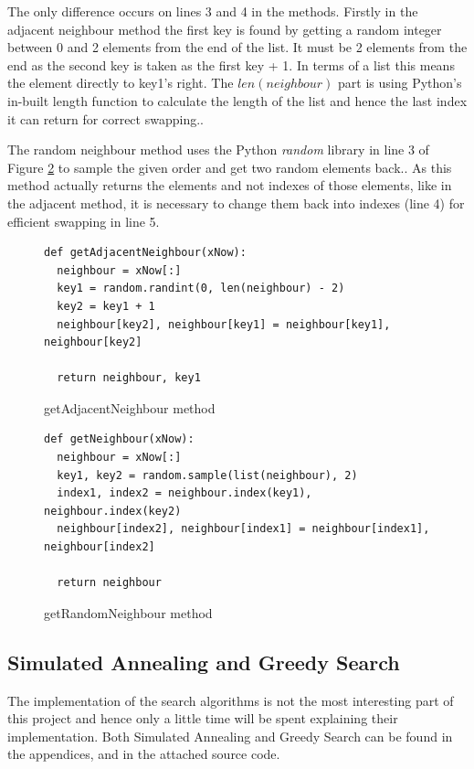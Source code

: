 \documentclass[12pt]{report}
\begin{document}
The only difference occurs on lines 3 and 4 in the methods. Firstly in the adjacent neighbour method the first key is found by getting a random integer between 0 and 2 elements from the end of the list. It must be 2 elements from the end as the second key is taken as the first key + 1. In terms of a list this means the element directly to key1's right. The $len(neighbour)$ part is using Python's in-built length function to calculate the length of the list and hence the last index it can return for correct swapping.\cite{PythonLen}.

The random neighbour method uses the Python \textit{random} library in line 3 of Figure \ref{randomNeighbour} to sample the given order and get two random elements back.\cite{PythonSample}. As this method actually returns the elements and not indexes of those elements, like in the adjacent method, it is necessary to change them back into indexes (line 4) for efficient swapping in line 5.

\begin{figure}[H]
\caption{getAdjacentNeighbour method}
\label{adjacentNeighbour}
\begin{lstlisting}
def getAdjacentNeighbour(xNow):
  neighbour = xNow[:]
  key1 = random.randint(0, len(neighbour) - 2)
  key2 = key1 + 1
  neighbour[key2], neighbour[key1] = neighbour[key1], neighbour[key2]
    
  return neighbour, key1
\end{lstlisting}
\end{figure}

\begin{figure}[H]
\caption{getRandomNeighbour method}
\label{randomNeighbour}
\begin{lstlisting}
def getNeighbour(xNow):
  neighbour = xNow[:]
  key1, key2 = random.sample(list(neighbour), 2)
  index1, index2 = neighbour.index(key1), neighbour.index(key2)
  neighbour[index2], neighbour[index1] = neighbour[index1], neighbour[index2]
    
  return neighbour
\end{lstlisting}
\end{figure}

\subsection{Simulated Annealing and Greedy Search}\label{Imp-searchAlgos}
The implementation of the search algorithms is not the most interesting part of this project and hence only a little time will be spent explaining their implementation. Both Simulated Annealing and Greedy Search can be found in the appendices, and in the attached source code.
\end{document}
